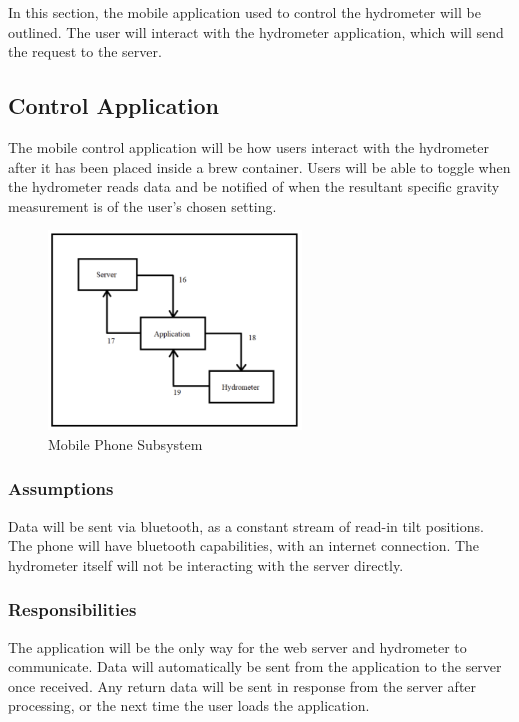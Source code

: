 In this section, the mobile application used to control the hydrometer will be outlined. The user will interact with the hydrometer application, which will send the request to the server.

\subsection{Control Application}
The mobile control application will be how users interact with the hydrometer after it has been placed inside a brew container. Users will be able to toggle when the hydrometer reads data and be notified of when the resultant specific gravity measurement is of the user's chosen setting.

\begin{figure}[h!]
	\centering
 	\includegraphics[width=0.60\textwidth]{images/mobile_phone_subsystem}
 \caption{Mobile Phone Subsystem}
\end{figure}

\subsubsection{Assumptions}
Data will be sent via bluetooth, as a constant stream of read-in tilt positions. The phone will have bluetooth capabilities, with an internet connection. The hydrometer itself will not be interacting with the server directly.

\subsubsection{Responsibilities}
The application will be the only way for the web server and hydrometer to communicate. Data will automatically be sent from the application to the server once received. Any return data will be sent in response from the server after processing, or the next time the user loads the application.

